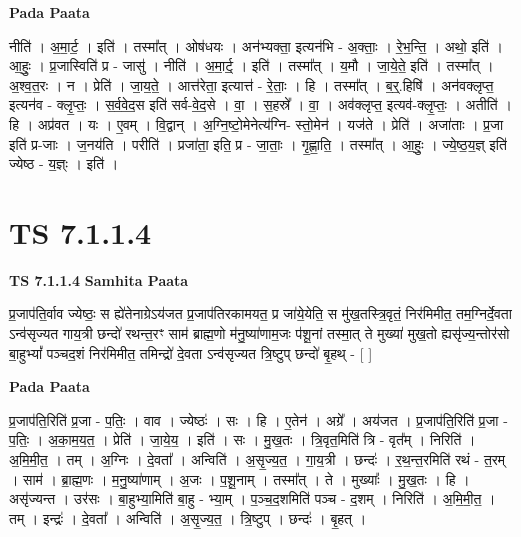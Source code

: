 \documentclass[17pt]{extarticle}
\begin{document}
\textbf{Pada Paata} \newline

नीति॑ । अ॒मा॒र्ट॒ । इति॑ । तस्मा᳚त् । ओष॑धयः । अन॑भ्यक्ता॒ इत्यन॑भि - अ॒क्ताः॒ । रे॒भ॒न्ति॒ । अथो॒ इति॑ । आ॒हुः॒ । प्र॒जास्विति॑ प्र - जासु॑ । नीति॑ । अ॒मा॒र्ट्॒ । इति॑ । तस्मा᳚त् । य॒मौ । जा॒ये॒ते॒ इति॑ । तस्मा᳚त् । अ॒श्व॒त॒रः । न । प्रेति॑ । जा॒य॒ते॒ । आत्त॑रेता॒ इत्यात्त॑ - रे॒ताः॒ । हि । तस्मा᳚त् । ब॒र्॒.हिषि॑ । अन॑वक्लृप्त॒ इत्यन॑व - क्लृ॒प्तः॒ । स॒र्व॒वे॒द॒स इति॑ सर्व-वे॒द॒से । वा॒ । स॒हस्रे᳚ । वा॒ । अव॑क्लृप्त॒ इत्यव॑-क्लृ॒प्तः॒ । अतीति॑ । हि । अप्र॑वत । यः । ए॒वम् । वि॒द्वान् । अ॒ग्नि॒ष्टो॒मेनेत्य॑ग्नि- स्तो॒मेन॑ । यज॑ते । प्रेति॑ । अजा॑ताः । प्र॒जा इति॑ प्र-जाः । ज॒नय॑ति । परीति॑ । प्रजा॑ता॒ इति॒ प्र - जा॒ताः॒ । गृ॒ह्णा॒ति॒ । तस्मा᳚त् । आ॒हुः॒ । ज्ये॒ष्ठ॒य॒ज्ञ् इति॑ ज्येष्ठ - य॒ज्ञ्ः । इति॑ ।  \newline





\section{ TS 7.1.1.4 }

\textbf{TS 7.1.1.4 } \newline
\textbf{Samhita Paata} \newline

प्र॒जाप॑ति॒र्वाव ज्येष्ठः॒ स ह्ये॑तेनाग्रेऽय॑जत प्र॒जाप॑तिरकामयत॒ प्र जा॑ये॒येति॒ स मु॑ख॒तस्त्रि॒वृतं॒ निर॑मिमीत॒ तम॒ग्निर्दे॒वता ऽन्व॑सृज्यत गाय॒त्री छन्दो॑ रथन्त॒रꣳ साम॑ ब्राह्म॒णो म॑नु॒ष्या॑णाम॒जः प॑शू॒नां तस्मा॒त् ते मुख्या॑ मुख॒तो ह्यसृ॑ज्य॒न्तोर॑सो बा॒हुभ्यां᳚ पञ्चद॒शं निर॑मिमीत॒ तमिन्द्रो॑ दे॒वता ऽन्व॑सृज्यत त्रि॒ष्टुप् छन्दो॑ बृ॒हथ् - [  ] \newline

\textbf{Pada Paata} \newline

प्र॒जाप॑ति॒रिति॑ प्र॒जा - प॒तिः॒ । वाव । ज्येष्ठः॑ । सः । हि । ए॒तेन॑ । अग्रे᳚ । अय॑जत । प्र॒जाप॑ति॒रिति॑ प्र॒जा - प॒तिः॒ । अ॒का॒म॒य॒त॒ । प्रेति॑ । जा॒ये॒य॒ । इति॑ । सः । मु॒ख॒तः । त्रि॒वृत॒मिति॑ त्रि - वृत᳚म् । निरिति॑ । अ॒मि॒मी॒त॒ । तम् । अ॒ग्निः । दे॒वता᳚ । अन्विति॑ । अ॒सृ॒ज्य॒त॒ । गा॒य॒त्री । छन्दः॑ । र॒थ॒न्त॒रमिति॑ रथं - त॒रम् । साम॑ । ब्रा॒ह्म॒णः । म॒नु॒ष्या॑णाम् । अ॒जः । प॒शू॒नाम् । तस्मा᳚त् । ते । मुख्याः᳚ । मु॒ख॒तः । हि । असृ॑ज्यन्त । उर॑सः । बा॒हुभ्या॒मिति॑ बा॒हु - भ्या॒म् । प॒ञ्च॒द॒शमिति॑ पञ्च - द॒शम् । निरिति॑ । अ॒मि॒मी॒त॒ । तम् । इन्द्रः॑ । दे॒वता᳚ । अन्विति॑ । अ॒सृ॒ज्य॒त॒ । त्रि॒ष्टुप् । छन्दः॑ । बृ॒हत् ।  \newline
\end{document}
